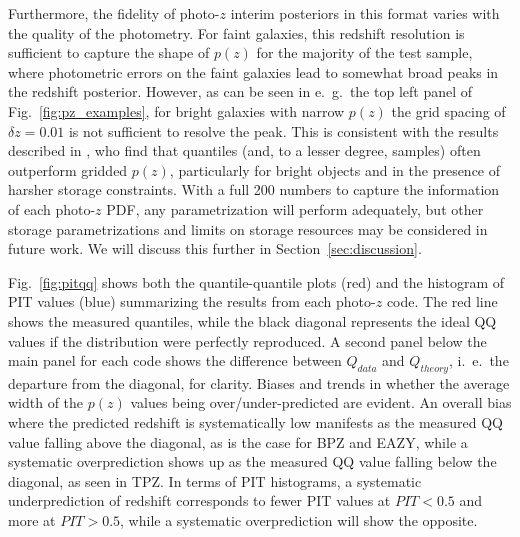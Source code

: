 Furthermore, the fidelity of photo-$z$ interim posteriors in this format varies with the quality of the photometry.
For faint galaxies, this redshift resolution is sufficient to capture the shape of $p(z)$ for the majority of the test sample, where photometric errors on the faint galaxies lead to somewhat broad peaks in the redshift posterior.
However, as can be seen in e.~g.~the top left panel of Fig.~\ref{fig:pz_examples}, for bright galaxies with narrow $p(z)$ the grid spacing of $\delta z = 0.01$ is not sufficient to resolve the peak.
This is consistent with the results described in \citet[]{Malz:qp}, who find that quantiles (and, to a lesser degree, samples) often outperform gridded $p(z)$, particularly for bright objects and in the presence of harsher storage constraints.
With a full 200 numbers to capture the information of each photo-$z$ PDF, any parametrization will perform adequately, but other storage parametrizations and limits on storage resources may be considered in future work.
We will discuss this further in Section~\ref{sec:discussion}.

Fig.~\ref{fig:pitqq} shows both the quantile-quantile plots (red) and the histogram of PIT values (blue) summarizing the results from each photo-$z$ code.  The red line shows the measured quantiles, while the black diagonal represents the ideal QQ values if the distribution were perfectly reproduced.  A second panel below the main panel for each code shows the difference between $Q_{data}$ and $Q_{theory}$, i.~e.~the departure from the diagonal, for clarity.
Biases and trends in whether the average width of the $p(z)$ values being over/under-predicted are evident.  An overall bias where the predicted redshift is systematically low manifests as the measured QQ value falling above the diagonal, as is the case for \textsc{BPZ} and \textsc{EAZY}, while a systematic overprediction shows up as the measured QQ value falling below the diagonal, as seen in \textsc{TPZ}.  In terms of PIT histograms, a systematic underprediction of redshift corresponds to fewer PIT values at $PIT<0.5$ and more at $PIT>0.5$, while a systematic overprediction will show the opposite.

